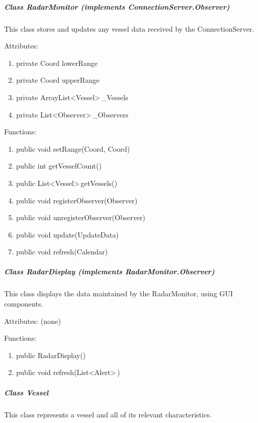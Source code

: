 \documentclass{article}
\begin{document}
\subparagraph{Class RadarMonitor (implements ConnectionServer.Observer)}
This class stores and updates any vessel data received by the ConnectionServer.

\vspace{0.5cm}

Attributes:
\begin{enumerate}
	\item private Coord lowerRange
    \item private Coord upperRange
    \item private ArrayList\textless Vessel\textgreater \,\_Vessels
    \item private List\textless Observer\textgreater \,\_Observers
\end {enumerate}

\vspace{0.5cm}

Functions:
\begin{enumerate}
	\item public void setRange(Coord, Coord)
	\item public int getVesselCount()
	\item public List\textless Vessel\textgreater \,getVessels()
	\item public void registerObserver(Observer)
	\item public void unregisterObserver(Observer)
	\item public void update(UpdateData)
	\item public void refresh(Calendar)
\end{enumerate}

\subparagraph{Class RadarDisplay (implements RadarMonitor.Observer)}
This class displays the data maintained by the RadarMonitor, using GUI components.

\vspace{0.5cm}

Attributes: (none)

\vspace{0.5cm}

Functions:
\begin{enumerate}
	\item public RadarDisplay()
	\item public void refresh(List\textless Alert\textgreater \,)
\end{enumerate}

\subparagraph{Class Vessel}
This class represents a vessel and all of its relevant characteristics.

\vspace{0.5cm}
\end{document}
